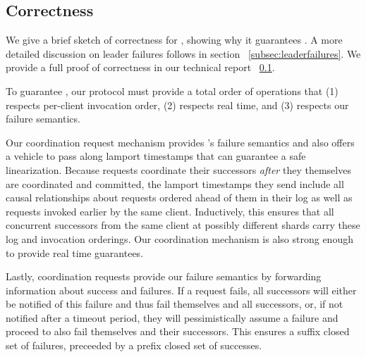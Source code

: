 \subsection{Correctness}
We give a brief sketch of correctness for \protocol, showing why it guarantees \mdl. A more detailed discussion on leader failures follows in section ~\ref{subsec:leaderfailures}. We provide a full proof of correctness in our technical report ~\ref{}.

To guarantee \mdl, our protocol must provide a total order of operations that (1) respects per-client invocation order, (2) respects real time, and (3) respects our failure semantics. 

Our coordination request mechanism provides \md's failure semantics and also offers a vehicle to pass along lamport timestamps that can guarantee a safe linearization. Because requests coordinate their successors \textit{after} they themselves are coordinated and committed, the lamport timestamps they send include all causal relationships about requests ordered ahead of them in their log as well as requests invoked earlier by the same client. 
Inductively, this ensures that all concurrent successors from the same client at possibly different shards carry these log and invocation orderings. Our coordination mechanism is also strong enough to provide real time guarantees.

Lastly, coordination requests provide our failure semantics by forwarding information about success and failures. If a request fails, all successors will either be notified of this failure and thus fail themselves and all successors, or, if not notified after a timeout period, they will pessimistically assume a failure and proceed to also fail themselves and their successors. This ensures a suffix closed set of failures, preceeded by a prefix closed set of successes.


